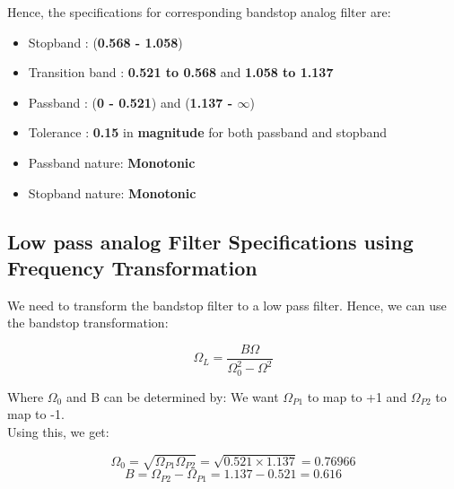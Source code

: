 \documentclass{article}
\begin{document}
Hence, the specifications for corresponding bandstop analog filter are:
\begin{itemize}
    \item Stopband : (\textbf{0.568 -  1.058})
    \item  Transition band : \textbf{0.521 to 0.568} and \textbf{1.058 to 1.137}
    \item Passband : (\textbf{0 - 0.521}) and (\textbf{1.137 - $\infty$})
    \item  Tolerance : \textbf{0.15} in \textbf{magnitude} for both passband and stopband
    \item Passband nature: \textbf{Monotonic}
    \item Stopband nature: \textbf{Monotonic}
\end{itemize}

\subsection{Low pass analog Filter Specifications using Frequency
Transformation}

We need to transform the bandstop filter to a low pass filter. Hence, we can use the bandstop transformation:
\vspace{-5mm}
\begin{center}
    \begin{equation*}
        \Omega_L = \frac{B\Omega}{\Omega_0^2-\Omega^2}
    \end{equation*}
\end{center}

Where $\Omega_0$ and B can be determined by:
We want $\Omega_{P1}$ to map to +1 and $\Omega_{P2}$ to map to -1.\\
Using this, we get:
\begin{center}
    \begin{equation*}
        \Omega_0 = \sqrt{\Omega_{P1}\Omega_{P2}} = \sqrt{0.521 \times 1.137} = 0.76966
    \end{equation*}
    \begin{equation*}
        B = \Omega_{P2} - \Omega_{P1} = 1.137 - 0.521 = 0.616
    \end{equation*}
\end{center}
\end{document}
